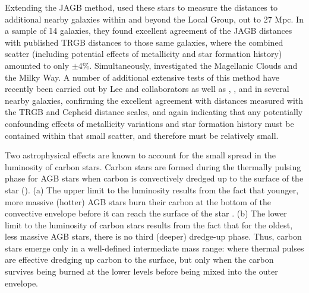 \documentclass[12pt,modern]{aastex631}
\begin{document}
Extending the JAGB method, \cite{freedman_madore_2020} used these stars to measure the distances to additional nearby galaxies within and beyond the Local Group, out to 27 Mpc. In a sample of 14 galaxies, they found excellent agreement of the JAGB distances with published TRGB distances to those same galaxies, where the combined scatter (including potential effects of metallicity and star formation history) amounted to only $\pm$4\%.  Simultaneously, \cite{ripoche_2020} investigated the Magellanic Clouds and the Milky Way. A number of additional extensive tests of this method have recently been carried out by Lee and collaborators \cite{lee_2021, lee_2022, lee_2023a, lee_2024a, lee_2024b} as well as \cite{parada_2021}, \cite{zgirski_2021}, and \cite{magnus_2024} in several nearby galaxies, confirming the excellent agreement with distances measured with the TRGB and Cepheid distance scales, and again indicating that any potentially confounding effects of metallicity variations and star formation history must be contained within that small scatter, and therefore must be relatively small. %


Two astrophysical  effects are known to account for the small spread in the  luminosity of carbon stars. Carbon stars are formed during the thermally pulsing  phase for AGB stars when carbon is convectively dredged up to the surface of the star (\cite{iben_renzini_1983, herwig_2013, habing_olofsson_2004, marigo_2017,  salaris_2014, pastorelli_2020}).  (a) The upper limit to the luminosity results from the fact that younger, more massive (hotter) AGB stars burn their carbon at the bottom of the convective envelope before it can reach the surface of the star \cite{boothroyd_1993}. (b) The lower limit to the luminosity of carbon stars results from the fact that for the oldest, less massive AGB stars, there is no third (deeper) dredge-up phase. Thus, carbon stars emerge only in a well-defined intermediate mass range: where thermal pulses are effective dredging up carbon to the surface, but only when the carbon survives being burned at the lower levels before being mixed into the outer envelope.
\end{document}
